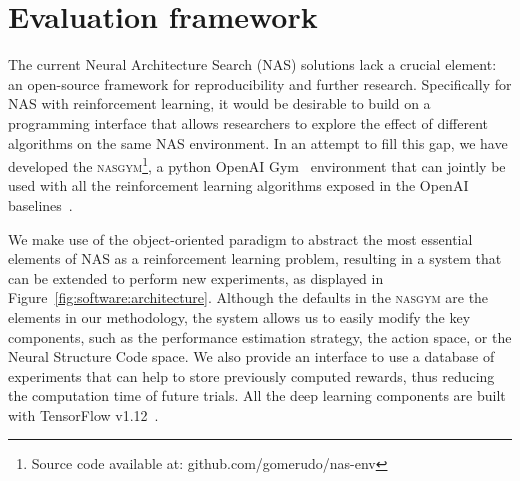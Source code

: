\section{Evaluation framework}\label{sec:software}

The current Neural Architecture Search (NAS) solutions lack a crucial element: an open-source framework for reproducibility and further research. Specifically for NAS with reinforcement learning, it would be desirable to build on a programming interface that allows researchers to explore the effect of different algorithms on the same NAS environment. In an attempt to fill this gap, we have developed the \textsc{nasgym}\footnote{Source code available at: github.com/gomerudo/nas-env}, a python OpenAI Gym~\citep{openaigym} environment that can jointly be used with all the reinforcement learning algorithms exposed in the OpenAI baselines~\citep{openaibaselines}. 

We make use of the object-oriented paradigm to abstract the most essential elements of NAS as a reinforcement learning problem, resulting in a system that can be extended to perform new experiments, as displayed in Figure~\ref{fig:software:architecture}. Although the defaults in the \textsc{nasgym} are the elements in our methodology, the system allows us to easily modify the key components, such as the performance estimation strategy, the action space, or the Neural Structure Code space. We also provide an interface to use a database of experiments that can help to store previously computed rewards, thus reducing the computation time of future trials. All the deep learning components are built with TensorFlow v1.12~\citep{tensorflow}.



